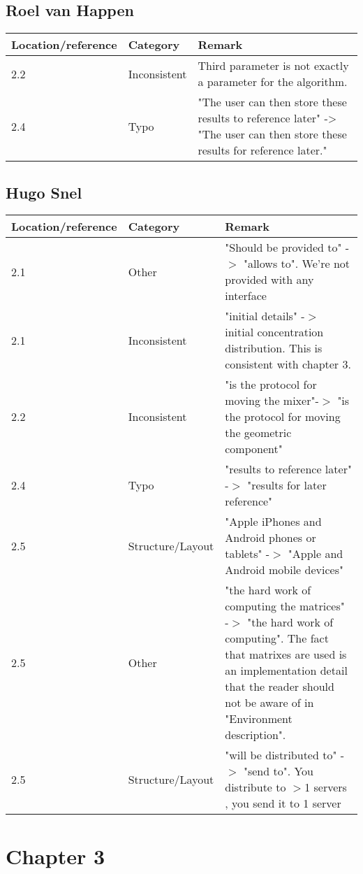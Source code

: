 \subsection*{Roel van Happen}

\begin{tabular}{l|l|p{}}
Location/reference & Category & Remark\\
\hline
\hline
2.2 & Inconsistent & Third parameter is not exactly a parameter for the algorithm.\\
2.4 & Typo & "The user can then store these results to reference later" -> "The user can then store these results for reference later."\\
\end{tabular}

\subsection*{Hugo Snel}

\begin{tabular}{l|l|p{}}
Location/reference & Category & Remark\\
\hline
\hline
2.1 & Other & "Should be provided to" -$>$ "allows to". We're not provided with any interface\\
2.1 & Inconsistent & "initial details" -$>$ initial concentration distribution. This is consistent with chapter 3.\\
2.2 & Inconsistent & "is the protocol for moving the mixer"-$>$ "is the protocol for moving the geometric component"\\
2.4 & Typo & "results to reference later" -$>$ "results for later reference"\\
2.5 & Structure/Layout & "Apple iPhones and Android phones or tablets" -$>$ "Apple and Android mobile devices"\\
2.5 & Other & "the hard work of computing the matrices" -$>$ "the hard work of computing". The fact that matrixes are used is an implementation detail that the reader should not be aware of in "Environment description".\\
2.5 & Structure/Layout & "will be distributed to" -$>$ "send to". You distribute to $>$1 servers , you send it to 1 server\\

\end{tabular}

\section{Chapter 3}
